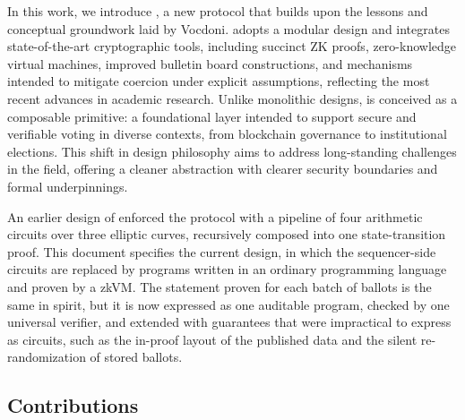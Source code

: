 In this work, we introduce \davinci, a new protocol that builds upon the lessons and conceptual groundwork laid by Vocdoni. \Davinci adopts a modular design and integrates state-of-the-art cryptographic tools, including succinct ZK proofs, zero-knowledge virtual machines, improved bulletin board constructions, and mechanisms intended to mitigate coercion under explicit assumptions, reflecting the most recent advances in academic research. Unlike monolithic designs, \davinci is conceived as a composable primitive: a foundational layer intended to support secure and verifiable voting in diverse contexts, from blockchain governance to institutional elections. This shift in design philosophy aims to address long-standing challenges in the field, offering a cleaner abstraction with clearer security boundaries and formal underpinnings.

An earlier design of \davinci enforced the protocol with a pipeline of four arithmetic circuits over three elliptic curves, recursively composed into one state-transition proof. This document specifies the current design, in which the sequencer-side circuits are replaced by programs written in an ordinary programming language and proven by a \ac{zkVM}. The statement proven for each batch of ballots is the same in spirit, but it is now expressed as one auditable program, checked by one universal verifier, and extended with guarantees that were impractical to express as circuits, such as the in-proof layout of the published data and the silent re-randomization of stored ballots.

\subsection{Contributions}
\label{sec:introduction:contributions}

